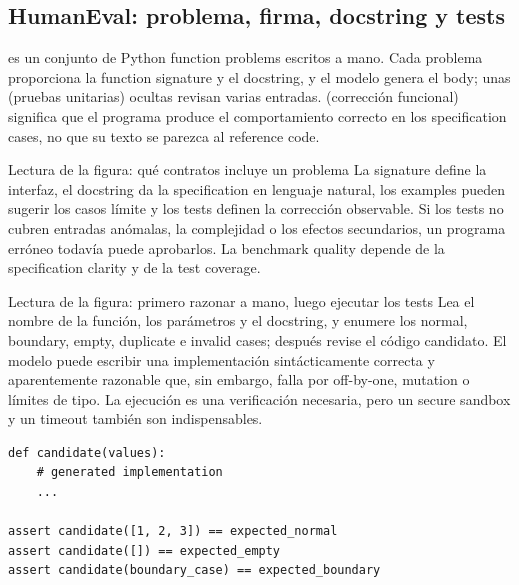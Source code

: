 \subsection{HumanEval: problema, firma, docstring y tests}

 es un conjunto de Python function problems escritos a mano. Cada problema proporciona la function signature y el docstring, y el modelo genera el body; unas  (pruebas unitarias) ocultas revisan varias entradas.  (corrección funcional) significa que el programa produce el comportamiento correcto en los specification cases, no que su texto se parezca al reference code.


\begin{knowledgebox}{Lectura de la figura: qué contratos incluye un problema}
La signature define la interfaz, el docstring da la specification en lenguaje natural, los examples pueden sugerir los casos límite y los tests definen la corrección observable. Si los tests no cubren entradas anómalas, la complejidad o los efectos secundarios, un programa erróneo todavía puede aprobarlos. La benchmark quality depende de la specification clarity y de la test coverage.
\end{knowledgebox}


\begin{knowledgebox}{Lectura de la figura: primero razonar a mano, luego ejecutar los tests}
Lea el nombre de la función, los parámetros y el docstring, y enumere los normal, boundary, empty, duplicate e invalid cases; después revise el código candidato. El modelo puede escribir una implementación sintácticamente correcta y aparentemente razonable que, sin embargo, falla por off-by-one, mutation o límites de tipo. La ejecución es una verificación necesaria, pero un secure sandbox y un timeout también son indispensables.
\end{knowledgebox}

\begin{lstlisting}[caption={Forma simplificada de un functional check al estilo HumanEval}]
def candidate(values):
    # generated implementation
    ...

assert candidate([1, 2, 3]) == expected_normal
assert candidate([]) == expected_empty
assert candidate(boundary_case) == expected_boundary
\end{lstlisting}

